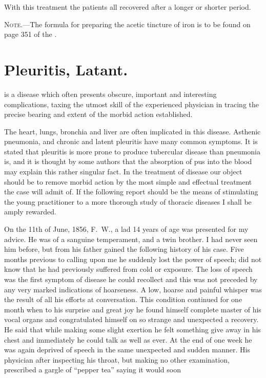 
With this treatment the patients all recovered after a longer or shorter
period.

\textsc{Note.---}The formula for preparing the acetic tincture of iron is to be
found on page 351 of the .

\arrowbulletornament

\section*{Pleuritis, Latant.}


 is a disease which often presents obscure, important and interesting
complications, taxing the utmost skill of the experienced physician
in tracing the precise bearing and extent of the morbid action
established.

The heart, lungs, bronchia and liver are often implicated in this disease.
Asthenic pneumonia, and chronic and latent pleuritis have many common
symptoms. It is stated that pleuritis is more prone to produce
tubercular disease than pneumonia is, and it is thought by some authors
that the absorption of pus into the blood may explain this rather singular
fact. In the treatment of disease our object should be to remove
morbid action by the most simple and effectual treatment the case will
admit of. If the following report should be the means of stimulating
the young practitioner to a more thorough study of thoracic diseases I
shall be amply rewarded.

On the 11th of June, 1856, F.~W., a lad 14 years of age was presented
for my advice. He was of a sanguine temperament, and a twin brother.
I had never seen him before, but from his father gained the following
history of his case. Five months previous to calling upon me he suddenly
lost the power of speech; did not know that he had previously
suffered from cold or exposure. The loss of speech was the first symptom
of disease he could recollect and this was not preceded by any
very marked indications of hoarseness. A low, hoarse and painful
whisper was the result of all his efforts at conversation. This condition
continued for one month when to his surprise and great joy he found
himself complete master of his vocal organs and congratulated himself
on so strange and unexpected a recovery. He said that while making
some slight exertion he felt something give away in his chest and immediately
he could talk as well as ever. At the end of one week he
was again deprived of speech in the same unexpected and sudden manner.
His physician after inspecting his throat, but making no other
examination, prescribed a gargle of ``pepper tea'' saying it would soon\endinput
